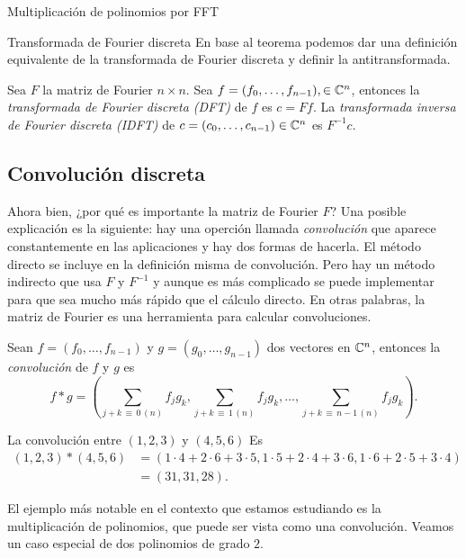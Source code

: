 \begin{chapter}{Multiplicación de polinomios por FFT}
\begin{section}{Transformada de Fourier discreta}
  En  base al teorema podemos dar una definición equivalente de la transformada de Fourier discreta y definir la antitransformada.

  \begin{definicion}
      Sea $F$ la matriz de Fourier $n \times n$. Sea  $f = (f_0,\ldots,f_{n-1}), \in \mathbb C^n$, entonces la \textit{transformada de Fourier discreta (DFT)} de $f$ es $c = Ff$. La \textit{transformada inversa de Fourier discreta (IDFT)} de $c = (c_0,\ldots,c_{n-1}) \in \mathbb C^n$ es $F^{-1}c$.
  \end{definicion}

  \subsection*{Convolución discreta}

  Ahora bien, ¿por  qué es importante la matriz de Fourier $F$? Una posible explicación es la siguiente: hay una operción llamada \textit{convolución} que aparece constantemente en las aplicaciones y hay dos formas de hacerla. El método directo se incluye en la definición misma de convolución. Pero  hay un método indirecto que usa $F$ y $F^{-1}$ y aunque es más complicado se puede implementar para que sea mucho más rápido que el cálculo directo. En otras palabras,  la matriz de Fourier es una herramienta para calcular convoluciones.

  \begin{definicion}
      Sean $f = (f_0,\ldots, f_{n-1})$ y $g = (g_0,\ldots, g_{n-1})$ dos vectores en $\mathbb C^n$,  entonces la  \textit{convolución} de $f$ y $g$ es
      \begin{equation*}
          f * g = \left(\sum_{j+k \,\equiv\, 0\, (n)} f_jg_k, \sum_{j+k \,\equiv\, 1\, (n)} f_jg_k, \ldots, \sum_{j+k\, \equiv\, n-1 \,(n)} f_jg_k\right).
      \end{equation*}
  \end{definicion}

  \begin{ejemplo}
      La convolución entre $(1,2,3)$ y $(4,5,6)$ Es
      \begin{align*}
          (1,2,3)*(4,5,6) & = (1 \cdot 4 + 2\cdot 6 + 3\cdot 5, 1\cdot 5+  2\cdot 4 + 3\cdot 6, 1\cdot 6 + 2\cdot 5 + 3\cdot 4) \\ &= (31, 31, 28).
      \end{align*}
  \end{ejemplo}

  \begin{ejemplo}\label{ejem-convolucion-polinomios}
      El ejemplo más notable en el contexto  que estamos estudiando es la multiplicación de polinomios, que puede ser vista como  una convolución. Veamos un caso especial de dos polinomios de grado $2$.


\end{ejemplo}
\end{section}
\end{chapter}
